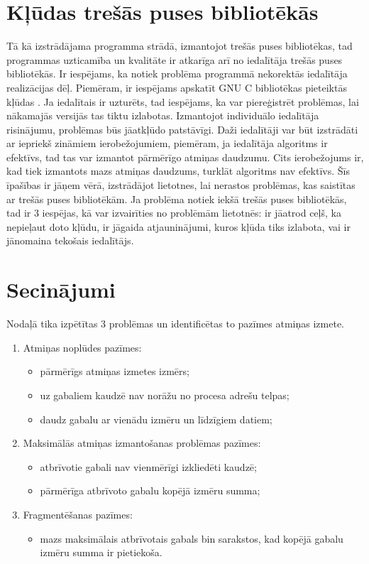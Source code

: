 \section{Kļūdas trešās puses bibliotēkās}
Tā kā izstrādājama programma strādā, izmantojot trešās puses bibliotēkas, tad programmas uzticamība un kvalitāte ir atkarīga arī no iedalītāja trešās puses bibliotēkās.
Ir iespējams, ka notiek problēma programmā nekorektās iedalītāja realizācijas dēļ.
Piemēram, ir iespējams apskatīt GNU C bibliotēkas pieteiktās kļūdas \cite{MUE}.
Ja iedalītais ir uzturēts, tad iespējams, ka var piereģistrēt problēmas, lai nākamajās versijās tas tiktu izlabotas.
Izmantojot individuālo iedalītāja risinājumu, problēmas būs jāatkļūdo patstāvīgi.  
Daži iedalītāji var būt izstrādāti ar iepriekš zināmiem ierobežojumiem, piemēram, ja iedalītāja algoritms ir efektīvs, tad tas var izmantot pārmērīgo atmiņas daudzumu.
Cits ierobežojums ir, kad tiek izmantots mazs atmiņas daudzums, turklāt algoritms nav efektīvs.
Šīs īpašības ir jāņem vērā, izstrādājot lietotnes, lai nerastos problēmas, kas saistītas ar trešās puses bibliotēkām.
Ja problēma notiek iekšā trešās puses bibliotēkās, tad ir 3 iespējas, kā var izvairīties no problēmām lietotnēs: ir jāatrod ceļš, ka nepieļaut doto kļūdu, ir jāgaida atjauninājumi, kuros kļūda tiks izlabota, vai ir jānomaina tekošais iedalītājs. 


\section{Secinājumi}
Nodaļā tika izpētītas 3 problēmas un identificētas to pazīmes atmiņas izmete.
\begin{enumerate}
\item Atmiņas noplūdes pazīmes:
    \begin{itemize} \itemsep5pt \parskip5pt 
        \item pārmērīgs atmiņas izmetes izmērs;
        \item uz gabaliem kaudzē nav norāžu no procesa adrešu telpas;
        \item daudz gabalu ar vienādu izmēru un līdzīgiem datiem;
    \end{itemize}
\item Maksimālās atmiņas izmantošanas problēmas pazīmes:
    \begin{itemize} \itemsep5pt \parskip5pt 
        \item atbrīvotie gabali nav vienmērīgi izkliedēti kaudzē;
        \item pārmērīga atbrīvoto gabalu kopējā izmēru summa;
    \end{itemize}
 \item Fragmentēšanas pazīmes:
    \begin{itemize} \itemsep5pt \parskip5pt 
        \item mazs maksimālais atbrīvotais gabals bin sarakstos, kad kopējā gabalu izmēru summa ir pietiekoša.
    \end{itemize}
\end{enumerate}



